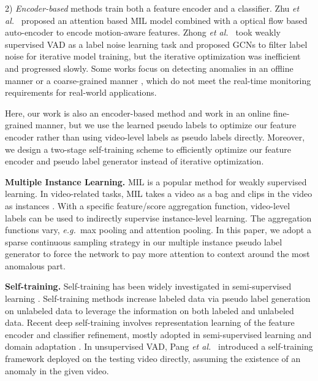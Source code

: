 \documentclass[final]{cvpr}
\newcommand{\ftst}{\textcolor[rgb]{0,0, 0}}
\newcommand{\ftnd}{\textcolor[rgb]{0.,0,0}}
\newcommand{\jcst}{\textcolor[rgb]{0,0,0}}
\newcommand{\jcnd}{\textcolor[rgb]{0,0.,0}}
\newcommand{\jcca}{\textcolor[rgb]{0,0,0}}
\renewcommand{\eg}{\textit{e.g.\ }}
\newcommand{\et}{\textit{et al.\ }}
\begin{document}
2) \textit{Encoder-based} methods train both a feature encoder and a classifier. Zhu \et \cite{zhu2019motion} proposed an attention based MIL model combined with a optical flow based auto-encoder to encode motion-aware features.
Zhong \et  \cite{zhong2019graph} took weakly supervised VAD as a label noise learning task and proposed GCNs to filter label noise for iterative model training, \jcst{ but the iterative optimization was inefficient and progressed slowly.}
\jcca{Some works focus on detecting anomalies in an offline manner \cite{ullah2020cnn,wu2020not} or a coarse-grained manner \cite{sultani2018real,zhang2019temporal,zhu2019motion,ullah2020cnn,wu2020not}, which do not meet the real-time monitoring requirements for real-world applications.}


Here, our work is also an encoder-based method \jcca{and work in an online fine-grained manner}, but \ftst{we use the learned pseudo labels to optimize our feature encoder  rather than using video-level labels as pseudo labels directly. Moreover, we design a two-stage self-training scheme to efficiently optimize our feature encoder and pseudo label generator instead of iterative optimization\cite{zhong2019graph}.}

\vspace{0.1cm}
\noindent \textbf{Multiple Instance Learning.} MIL is a popular method for weakly supervised learning. \ftnd{In video-related tasks}, MIL takes a video as a bag and clips in the video as instances \cite{sultani2018real,nguyen2018weakly,hong2020mini}. With a specific feature/score aggregation function, video-level labels can be used to indirectly supervise instance-level learning. The aggregation functions vary, \eg max pooling\cite{sultani2018real,zhang2019temporal,zhu2019motion} and attention pooling\cite{nguyen2018weakly,hong2020mini}.
In this paper, we adopt a sparse continuous sampling strategy in our multiple instance pseudo label generator to
\jcnd{ force the network to pay more attention to context around the most anomalous part.}


\vspace{0.1cm}
\noindent \textbf{Self-training.} Self-training has been widely investigated in semi-supervised learning \cite{amini2002semi,lee2013pseudo,grandvalet2005semi,yarowsky1995unsupervised,triguero2015self,zou2019confidence}. 
\jcst{Self-training methods increase labeled data via pseudo label generation on unlabeled data to leverage the information on both labeled and unlabeled data}. \jcst{Recent deep self-training involves representation learning of the feature encoder and classifier refinement, mostly adopted in semi-supervised learning \cite{lee2013pseudo} and domain adaptation \cite{zou2018unsupervised,zou2019confidence}. }
\jcca{In unsupervised VAD, Pang \et \cite{pang2020self} introduced a self-training framework deployed on the testing video directly, assuming the existence of an anomaly in the given video.}
\end{document}
